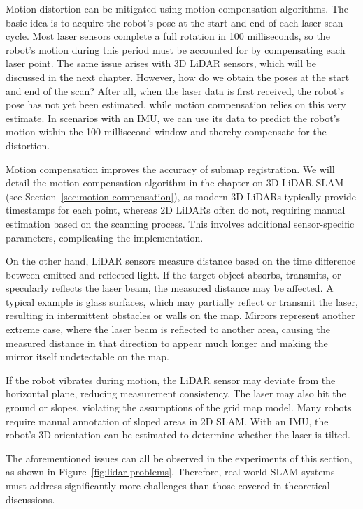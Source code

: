 Motion distortion can be mitigated using motion compensation algorithms. The basic idea is to acquire the robot's pose at the start and end of each laser scan cycle. Most laser sensors complete a full rotation in 100 milliseconds, so the robot's motion during this period must be accounted for by compensating each laser point. The same issue arises with 3D LiDAR sensors, which will be discussed in the next chapter. However, how do we obtain the poses at the start and end of the scan? After all, when the laser data is first received, the robot's pose has not yet been estimated, while motion compensation relies on this very estimate. In scenarios with an IMU, we can use its data to predict the robot's motion within the 100-millisecond window and thereby compensate for the distortion.

Motion compensation improves the accuracy of submap registration. We will detail the motion compensation algorithm in the chapter on 3D LiDAR SLAM (see Section~\ref{sec:motion-compensation}), as modern 3D LiDARs typically provide timestamps for each point, whereas 2D LiDARs often do not, requiring manual estimation based on the scanning process. This involves additional sensor-specific parameters, complicating the implementation.

On the other hand, LiDAR sensors measure distance based on the time difference between emitted and reflected light. If the target object absorbs, transmits, or specularly reflects the laser beam, the measured distance may be affected. A typical example is glass surfaces, which may partially reflect or transmit the laser, resulting in intermittent obstacles or walls on the map. Mirrors represent another extreme case, where the laser beam is reflected to another area, causing the measured distance in that direction to appear much longer and making the mirror itself undetectable on the map.

If the robot vibrates during motion, the LiDAR sensor may deviate from the horizontal plane, reducing measurement consistency. The laser may also hit the ground or slopes, violating the assumptions of the grid map model. Many robots require manual annotation of sloped areas in 2D SLAM. With an IMU, the robot's 3D orientation can be estimated to determine whether the laser is tilted.

The aforementioned issues can all be observed in the experiments of this section, as shown in Figure~\ref{fig:lidar-problems}. Therefore, real-world SLAM systems must address significantly more challenges than those covered in theoretical discussions.

